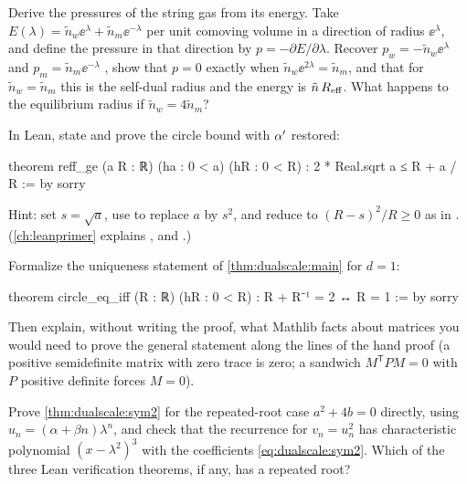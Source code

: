 \begin{exercise}[$\star\star$]
Derive the pressures of the string gas from its energy. Take $E(\lambda)=\tilde n_w
\ee^{\lambda}+\tilde n_m\ee^{-\lambda}$ per unit comoving volume in a direction of radius
$\ee^{\lambda}$, and define the pressure in that direction by $p=-\partial E/\partial\lambda$.
Recover $p_w=-\tilde n_w\ee^{\lambda}$ and $p_m=\tilde n_m\ee^{-\lambda}$
, show that $p=0$ exactly when
$\tilde n_w\ee^{2\lambda}=\tilde n_m$, and that for $\tilde n_w=\tilde n_m$ this is the
self-dual radius and the energy is $\tilde n\,R_{\rm eff}$. What happens to the equilibrium
radius if $\tilde n_w=4\tilde n_m$?
\end{exercise}

\begin{exercise}[$\star\star$]\label{ex:dualscale:leancircle}
In Lean, state and prove the circle bound with $\alpha'$ restored:
\begin{leancode}
theorem reff_ge (a R : ℝ) (ha : 0 < a) (hR : 0 < R) :
    2 * Real.sqrt a ≤ R + a / R := by
  sorry
\end{leancode}
Hint: set $s=\sqrt a$, use  to replace $a$ by $s^2$, and reduce to
$(R-s)^2/R\ge0$ as in . (\cref{ch:leanprimer}
explains ,  and .)
\end{exercise}

\begin{exercise}[$\star\star\star$]
Formalize the uniqueness statement of \cref{thm:dualscale:main} for $d=1$:
\begin{leancode}
theorem circle_eq_iff (R : ℝ) (hR : 0 < R) : R + R⁻¹ = 2 ↔ R = 1 := by
  sorry
\end{leancode}
Then explain, without writing the proof, what Mathlib facts about  matrices
you would need to prove the general statement  along the
lines of the hand proof (a positive semidefinite matrix with zero trace is zero; a sandwich
$M^{\mathsf T}PM=0$ with $P$ positive definite forces $M=0$).
\end{exercise}

\begin{exercise}[$\star\star\star$]
Prove \cref{thm:dualscale:sym2} for the repeated-root case $a^2+4b=0$ directly, using
$u_n=(\alpha+\beta n)\lambda^n$, and check that the recurrence for $v_n=u_n^2$ has
characteristic polynomial $(x-\lambda^2)^3$ with the coefficients \eqref{eq:dualscale:sym2}.
Which of the three Lean verification theorems, if any, has a repeated root?
\end{exercise}

